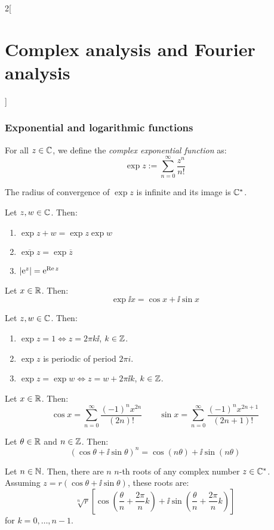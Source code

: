 \documentclass[../../../main.tex]{subfiles}
\begin{document}
\begin{multicols}{2}[\section{Complex analysis and Fourier analysis}]
  \subsubsection{Exponential and logarithmic functions}
  \begin{definition}
    For all $z \in \mathbb{C}$, we define the \textit{complex exponential function} as: $$\exp{z}:=\sum_{n=0}^\infty\frac{z^n}{n!}$$
  \end{definition}
  \begin{proposition}
    The radius of convergence of $\exp{z}$ is infinite and its image is $\mathbb{C}^*$.
  \end{proposition}
  \begin{proposition}
    Let $z,w\in\mathbb{C}$. Then:
    \begin{enumerate}
      \item $\exp{z+w}=\exp{z}\exp{w}$
      \item $\overline{\exp{z}}=\exp{\overline{z}}$
      \item $\abs{\mathrm{e}^{z}}=\mathrm{e}^{\Re z}$
    \end{enumerate}
  \end{proposition}
  \begin{corollary}
    Let $x\in\mathbb{R}$. Then: $$\exp{\ii x}=\cos x+\ii \sin x$$
  \end{corollary}
  \begin{corollary}
    Let $z,w\in\mathbb{C}$. Then:
    \begin{enumerate}
      \item $\exp{z}=1\iff z=2\pi k\ii$, $k\in\mathbb{Z}$.
      \item $\exp{z}$ is periodic of period $2\pi i$.
      \item $\exp{z}=\exp{w}\iff z=w+2\pi \ii k$, $k\in\mathbb{Z}$.
    \end{enumerate}
  \end{corollary}
  \begin{corollary}
    Let $x\in\mathbb{R}$. Then: $$\cos x=\sum_{n=0}^\infty\frac{(-1)^nx^{2n}}{(2n)!}\qquad\sin x=\sum_{n=0}^\infty\frac{(-1)^nx^{2n+1}}{(2n+1)!}$$
  \end{corollary}
  \begin{proposition}
    Let $\theta\in\mathbb{R}$ and $n\in\mathbb{Z}$. Then: $${(\cos{\theta} + \ii\sin{\theta})}^n = \cos(n\theta) + \ii\sin(n\theta)$$
  \end{proposition}
  \begin{theorem}
    Let $n\in\mathbb{N}$. Then, there are $n$ $n$-th roots of any complex number $z\in \mathbb{C}^*$. Assuming $z=r(\cos\theta + \ii\sin\theta)$, these roots are: $$\sqrt[n]{r}\left[\cos\left(\frac{\theta}{n}+\frac{2\pi}{n}k\right)+\ii\sin\left(\frac{\theta}{n}+\frac{2\pi}{n}k\right)\right]$$ for $k=0,\ldots,n-1$.

\end{theorem}
\end{multicols}
\end{document}
